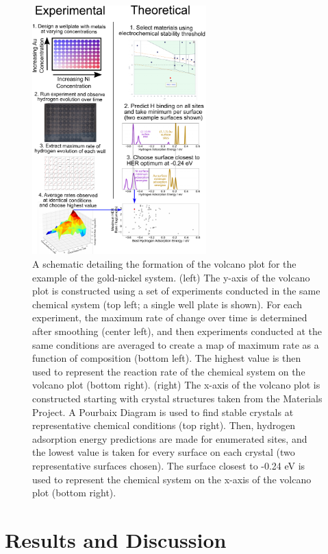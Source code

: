 \documentclass[preprint,12pt]{elsarticle}
\begin{document}
\begin{figure}[H]
\centering
    \includegraphics[width=0.6\textwidth]{figures/fig_3.pdf}
\caption{A schematic detailing the formation of the volcano plot for the example of the gold-nickel system. (left) The y-axis of the volcano plot is constructed using a set of experiments conducted in the same chemical system (top left; a single well plate is shown). For each experiment, the maximum rate of change over time is determined after smoothing (center left), and then experiments conducted at the same conditions are averaged to create a map of maximum rate as a function of composition (bottom left). The highest value is then used to represent the reaction rate of the chemical system on the volcano plot (bottom right). (right) The x-axis of the volcano plot is constructed starting with crystal structures taken from the Materials Project. A Pourbaix Diagram is used to find stable crystals at representative chemical conditions (top right). Then, hydrogen adsorption energy predictions are made for enumerated sites, and the lowest value is taken for every surface on each crystal (two representative surfaces chosen). The surface closest to -0.24 eV is used to represent the chemical system on the x-axis of the volcano plot (bottom right).
}
\end{figure}

\section{Results and Discussion}\label{Section:Results}
\end{document}
